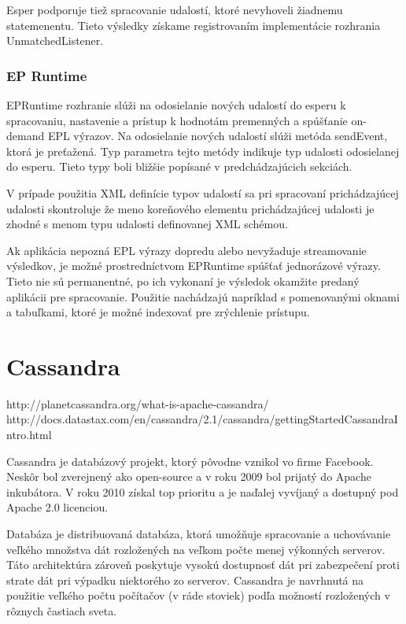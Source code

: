 		Esper podporuje tiež spracovanie udalostí, ktoré nevyhoveli žiadnemu statemenentu. Tieto výsledky získame registrovaním implementácie rozhrania UnmatchedListener. 
		
		\subsubsection{EP Runtime}
		EPRuntime rozhranie slúži na odosielanie nových udalostí do esperu k spracovaniu, nastavenie a prístup k hodnotám premenných a spúšťanie on-demand EPL výrazov. Na odosielanie nových udalostí slúži metóda sendEvent, ktorá je preťažená. Typ parametra tejto metódy indikuje typ udalosti odosielanej do esperu. Tieto typy boli bližšie popísané v predchádzajúcich sekciách.
		
		V prípade použitia XML definície typov udalostí sa pri spracovaní prichádzajúcej udalosti skontroluje že meno koreňového elementu prichádzajúcej udalosti je zhodné s menom typu udalosti definovanej XML schémou.
		
		Ak aplikácia nepozná EPL výrazy dopredu alebo nevyžaduje streamovanie výsledkov, je možné prostredníctvom EPRuntime spúšťať jednorázové výrazy. Tieto nie sú permanentné, po ich vykonaní je výsledok okamžite predaný aplikácii pre spracovanie. Použitie nachádzajú napríklad s pomenovanými oknami a tabuľkami, ktoré je možné indexovať pre zrýchlenie prístupu.		

\section{Cassandra}
	http://planetcassandra.org/what-is-apache-cassandra/
	http://docs.datastax.com/en/cassandra/2.1/cassandra/gettingStartedCassandraIntro.html
	
	Cassandra je databázový projekt, ktorý pôvodne vznikol vo firme Facebook. Neskôr bol zverejnený ako open-source a v roku 2009 bol prijatý do Apache inkubátora. V roku 2010 získal top prioritu a je naďalej vyvíjaný a dostupný pod Apache 2.0 licenciou.
	
	Databáza je distribuovaná databáza, ktorá umožňuje spracovanie a uchovávanie veľkého množstva dát rozložených na veľkom počte menej výkonných serverov. Táto architektúra zároveň poskytuje vysokú dostupnosť dát pri zabezpečení proti strate dát pri výpadku niektorého zo serverov. Cassandra je navrhnutá na použitie veľkého počtu počítačov (v ráde stoviek) podľa možností rozložených v rôznych častiach sveta.
	
